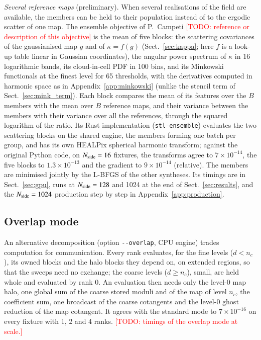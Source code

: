 \documentclass{aa}
\newcommand{\todo}[1]{\textcolor{red}{[TODO: #1]}}
\newcommand{\nside}{N_{\rm side}}
\begin{document}
\emph{Several reference maps} (preliminary). When several realisations of the field are available, the members can be held to their population instead of to the ergodic scatter of one map. The ensemble objective of P.~Campeti \todo{reference or description of this objective} is the mean of five blocks: the scattering covariances of the gaussianised map $g$ and of $\kappa=f(g)$ (Sect.~\ref{sec:kappa}; here $f$ is a look-up table linear in Gaussian coordinates), the angular power spectrum of $\kappa$ in 16 logarithmic bands, its cloud-in-cell PDF in 100 bins, and its Minkowski functionals at the finest level for 65 thresholds, with the derivatives computed in harmonic space as in Appendix~\ref{app:minkowski} (unlike the stencil term of Sect.~\ref{sec:mink_term}). Each block compares the mean of its features over the $B$ members with the mean over $B$ reference maps, and their variance between the members with their variance over all the references, through the squared logarithm of the ratio. Its Rust implementation (\texttt{stl-ensemble}) evaluates the two scattering blocks on the shared engine, the members forming one batch per group, and has its own HEALPix spherical harmonic transform; against the original Python code, on $\nside=16$ fixtures, the transforms agree to $7\times10^{-14}$, the five blocks to $1.3\times10^{-13}$ and the gradient to $9\times10^{-14}$ (relative). The members are minimised jointly by the L-BFGS of the other syntheses. Its timings are in Sect.~\ref{sec:gpu}, runs at $\nside=128$ and 1024 at the end of Sect.~\ref{sec:results}, and the $\nside=1024$ production step by step in Appendix~\ref{app:production}.

\subsection{Overlap mode}

An alternative decomposition (option \texttt{-{}-overlap}, CPU engine) trades computation for communication. Every rank evaluates, for the fine levels ($d < n_c$), its owned blocks and the halo blocks they depend on, on extended regions, so that the sweeps need no exchange; the coarse levels ($d\geq n_c$), small, are held whole and evaluated by rank 0. An evaluation then needs only the level-0 map halo, one global sum of the coarse stored moduli and of the map of level $n_c$, the coefficient sum, one broadcast of the coarse cotangents and the level-0 ghost reduction of the map cotangent. It agrees with the standard mode to $7\times10^{-16}$ on every fixture with 1, 2 and 4 ranks. \todo{timings of the overlap mode at scale.}
\end{document}

